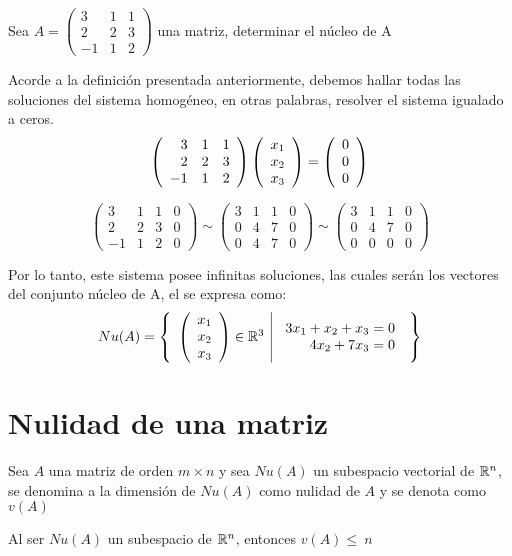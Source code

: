 \begin{ejemplo}
Sea $A=
\left(
\begin{array}{rrr}
3&1&1\\
2&2&3\\
-1&1&2
\end{array}
\right)$ una matriz, determinar el núcleo de A
 
Acorde a la definición presentada anteriormente, debemos hallar todas las soluciones del sistema homogéneo, en otras palabras, resolver el sistema igualado a ceros.
\[
\left(
\begin{array}{rrr}
3&1&1\\
2&2&3\\
-1&1&2
\end{array}
\right)
\left( \begin{array}{r} x_1\\ x_2\\ x_3 \end{array} \right) =
\left( \begin{array}{r} 0\\ 0\\ 0 \end{array} \right) 
\]

\[
\left(
\begin{array}{rrr|r}
3&1&1&0\\
2&2&3&0\\
-1&1&2&0
\end{array}
\right)
\sim
\left(
\begin{array}{rrr|r}
3&1&1&0\\
0&4&7&0\\
0&4&7&0
\end{array}
\right)
\sim
\left(
\begin{array}{rrr|r}
3&1&1&0\\
0&4&7&0\\
0&0&0&0
\end{array}
\right)
\]

Por lo tanto, este sistema posee infinitas soluciones, las cuales serán los vectores del conjunto núcleo de A, el se expresa como:
\[Nu(A)= \left\{\begin{array}{c|c} {\left( \begin{array}{c} x_1\\ x_2\\ x_3 \end{array}\right) \in \mathbb{R}^3 }&{\begin{array}{r}
    3x_1 + x_2 + x_3 = 0  \\
    4x_2 + 7x_3 = 0 
\end{array}} \end{array} \right\}
\]

\end{ejemplo}

\section{Nulidad de una matriz}
\begin{dfn}
Sea $A$ una matriz de orden $m\times n$ y sea $Nu(A)$ un subespacio vectorial de $\mathbb{R}^n$, se denomina a la dimensión de $Nu(A)$ como nulidad de $A$ y se denota como $v(A)$ 
\end{dfn}
\begin{theorem}[Corolario]
Al ser $Nu(A)$ un subespacio de $\mathbb{R}^n$, entonces $v(A) \leq~n$
\end{theorem} 

